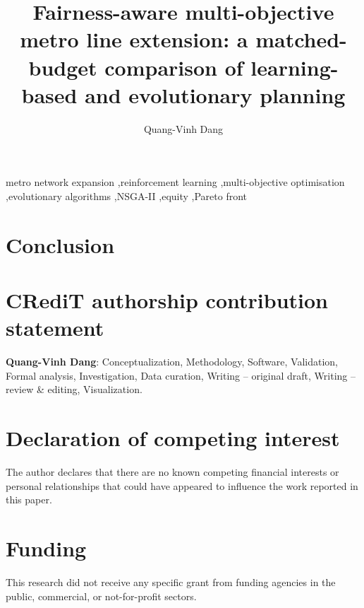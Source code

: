 \documentclass[preprint,12pt,authoryear]{elsarticle}
\begin{document}
\begin{frontmatter}

\title{Fairness-aware multi-objective metro line extension: a matched-budget comparison of learning-based and evolutionary planning}

\author[bu]{Quang-Vinh Dang}

\begin{abstract}

\end{abstract}

\begin{keyword}
metro network expansion \sep reinforcement learning \sep multi-objective optimisation \sep evolutionary algorithms \sep NSGA-II \sep equity \sep Pareto front
\end{keyword}

\end{frontmatter}









\section{Conclusion}\label{sec:conclusion}


\section*{CRediT authorship contribution statement}
\textbf{Quang-Vinh Dang}: Conceptualization, Methodology, Software, Validation, Formal analysis, Investigation, Data curation, Writing -- original draft, Writing -- review \& editing, Visualization.

\section*{Declaration of competing interest}
The author declares that there are no known competing financial interests or personal relationships that could have appeared to influence the work reported in this paper.

\section*{Funding}
This research did not receive any specific grant from funding agencies in the public, commercial, or not-for-profit sectors.
\end{document}
